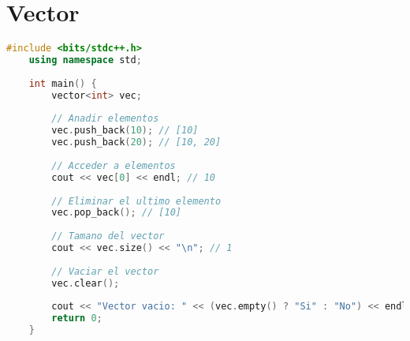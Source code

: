 
\section*{Vector}

\begin{lstlisting}[language=C++]
	#include <bits/stdc++.h>
	using namespace std;
	
	int main() {
		vector<int> vec;
		
		// Anadir elementos
		vec.push_back(10); // [10]
		vec.push_back(20); // [10, 20]
		
		// Acceder a elementos
		cout << vec[0] << endl; // 10
		
		// Eliminar el ultimo elemento
		vec.pop_back(); // [10]
		
		// Tamano del vector
		cout << vec.size() << "\n"; // 1
		
		// Vaciar el vector
		vec.clear();
		
		cout << "Vector vacio: " << (vec.empty() ? "Si" : "No") << endl;
		return 0;
	}
\end{lstlisting}
